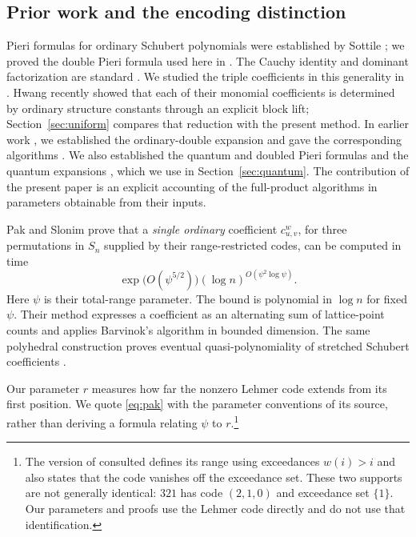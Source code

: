 \documentclass{amsart}
\theoremstyle{definition}
\theoremstyle{remark}
\numberwithin{equation}{section}
\begin{document}
\subsection{Prior work and the encoding distinction}\label{sec:prior}

Pieri formulas for ordinary Schubert polynomials were established by
Sottile \cite{sottile}; we proved the double Pieri formula used here in
\cite[Theorem~7.1]{samuelmolev}.
The Cauchy identity and dominant factorization are standard
\cite{notes}.
We studied the triple coefficients in this generality in
\cite{samuelmolev}.
Hwang \cite{hwang2026lifting} recently showed that each of their
monomial coefficients is determined by ordinary structure constants
through an explicit block lift; Section~\ref{sec:uniform} compares that
reduction with the present method.
In earlier work \cite{samuelquantum}, we established the ordinary-double
expansion \cite[Theorem~4.5]{samuelquantum} and gave the corresponding
algorithms \cite[Methods~4.9--4.11]{samuelquantum}.
We also established the quantum and doubled Pieri formulas and the
quantum expansions \cite[Theorems~4.6--4.7]{samuelquantum}, which we use
in Section~\ref{sec:quantum}.
The contribution of the present paper is an explicit accounting of the
full-product algorithms in parameters obtainable from their inputs.

Pak and Slonim \cite[Theorem~1.4]{pakslonim} prove that a
\emph{single ordinary} coefficient $c_{u,v}^w$, for three permutations in
$S_n$ supplied by their range-restricted codes, can be computed in time
\begin{equation}\label{eq:pak}
 \exp\bigl(O(\psi^{5/2})\bigr)
       (\log n)^{O(\psi^2\log\psi)}.
\end{equation}
Here $\psi$ is their total-range parameter.
The bound is polynomial in $\log n$ for fixed $\psi$.
Their method expresses a coefficient as an alternating sum of
lattice-point counts and applies Barvinok's algorithm in bounded
dimension. The same polyhedral construction proves eventual
quasi-polynomiality of stretched Schubert coefficients
\cite[Theorem~1.1]{pakslonim}.

Our parameter $r$ measures how far the nonzero
Lehmer code extends from its first position.
We quote \eqref{eq:pak} with the parameter conventions of its source,
rather than deriving a formula relating $\psi$ to $r$.\footnote{The
version of \cite{pakslonim} consulted defines its range using exceedances
$w(i)>i$ and also states that the code vanishes off the exceedance set.
These two supports are not generally identical: $321$ has code $(2,1,0)$
and exceedance set $\{1\}$.
Our parameters and proofs use the Lehmer code directly and do not use
that identification.}
\end{document}
